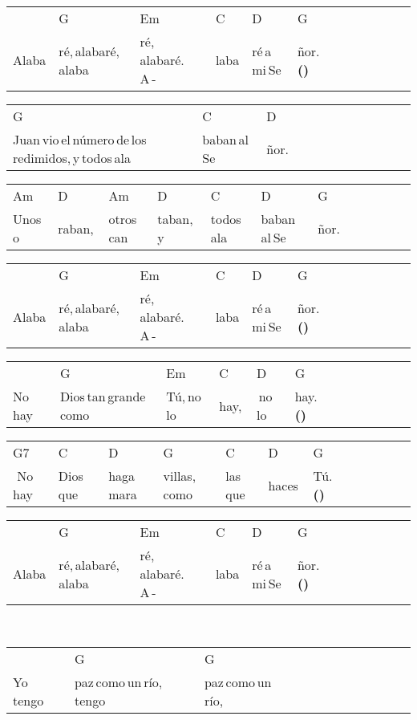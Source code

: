 \begin{multicols}{2}
\noindent
\begin{minipage}{\columnwidth}
\noindent
\noindent
\begin{tabular}{llllllllllll}
&G&Em&C&D&G\\
Alaba&ré,\,alabaré,\,alaba&ré,\,alabaré.\,A\,-\,&laba&ré\,a\,mi\,Se&ñor.\,\textbf{(\texttimes2)}
\end{tabular}

\noindent
\begin{tabular}{llllllllllll}
G&C&D\\
Juan\,vio\,el\,número\,de\,los\,redimidos,\,y\,todos\,ala&baban\,al\,Se&ñor.
\end{tabular}

\noindent
\begin{tabular}{llllllllllll}
Am&D&Am&D&C&D&G\\
Unos\,o&raban,\,&otros\,can&taban,\,y\,&todos\,ala&baban\,al\,Se&ñor.
\end{tabular}

\noindent
\begin{tabular}{llllllllllll}
&G&Em&C&D&G\\
Alaba&ré,\,alabaré,\,alaba&ré,\,alabaré.\,A\,-\,&laba&ré\,a\,mi\,Se&ñor.\,\textbf{(\texttimes2)}
\end{tabular}

\noindent
\begin{tabular}{llllllllllll}
&G&Em&C&D&G\\
No\,hay\,&Dios\,tan\,grande\,como\,&Tú,\,no\,lo\,&hay,\,&\,no\,lo\,&hay.\,\textbf{(\texttimes2)}
\end{tabular}

\noindent
\begin{tabular}{llllllllllll}
G7&C&D&G&C&D&G\\
\,\,No\,hay\,&Dios\,que\,&haga\,mara&villas,\,como\,&las\,que\,&haces\,&Tú.\,\textbf{(\texttimes2)}
\end{tabular}

\noindent
\begin{tabular}{llllllllllll}
&G&Em&C&D&G\\
Alaba&ré,\,alabaré,\,alaba&ré,\,alabaré.\,A\,-\,&laba&ré\,a\,mi\,Se&ñor.\,\textbf{(\texttimes2)}
\end{tabular}
\end{minipage}\\

\noindent
\begin{minipage}{\columnwidth}
\noindent
\noindent
\begin{tabular}{llllllllllll}
&G&G\\
Yo\,tengo\,&paz\,como\,un\,río,\,tengo\,&paz\,como\,un\,río,
\end{tabular}


\end{minipage}
\end{multicols}
